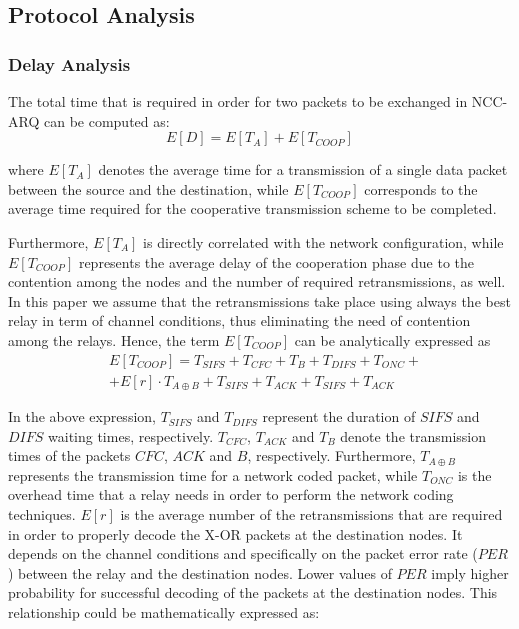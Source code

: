 \documentclass[conference]{IEEEtran}
\begin{document}
\subsection{Protocol Analysis}
\subsubsection{Delay Analysis}

The total time that is required in order for two packets to be exchanged in NCC-ARQ can be computed as:
\begin{equation}
\label{eq:delay}
 	E[D]= E[T_{A}]+E[T_{COOP}]
\end{equation}

where $E[T_{A}]$ denotes the average time for a transmission of a single data packet between the source and the destination, while $E[T_{COOP}]$ corresponds to the average time required for the cooperative transmission scheme to be completed.

Furthermore, $E[T_{A}]$ is directly correlated with the network configuration, while $E[T_{COOP}]$ represents the average delay of the cooperation phase due to the contention among the nodes and the number of required retransmissions, as well. In this paper we assume that the retransmissions take place using always the best relay in term of channel conditions, thus eliminating the need of contention among the relays. Hence, the term $E[T_{COOP}]$  can be analytically expressed as
\footnotesize
\begin{equation}
\label{eq:coop}
\begin{aligned}
 &E[T_{COOP}]=T_{SIFS}+T_{CFC}+T_{B}+T_{DIFS}+T_{ONC}+\\
 &+E[r]\cdot T_{A \oplus B}+T_{SIFS}+T_{ACK}+T_{SIFS}+T_{ACK}
 \end {aligned}
\end{equation}

\normalsize

In the above expression, $T_{SIFS}$ and $T_{DIFS}$ represent the duration of $SIFS$ and $DIFS$ waiting times, respectively. $T_{CFC}$, $T_{ACK}$ and $T_{B}$ denote the transmission times of the packets $CFC$, $ACK$ and $B$, respectively. Furthermore, $T_{A \oplus B}$ represents the transmission time for a network coded packet, while $T_{ONC}$ is the overhead time that a relay needs in order to perform the network coding techniques. $E[r]$ is the average number of the retransmissions that are required in order to properly decode the X-OR packets at the destination nodes. It depends on the channel conditions and specifically on the packet error rate ($PER$) between the relay and the destination nodes. Lower values of $PER$ imply higher probability for successful decoding of the packets at the destination nodes. This relationship could be mathematically expressed as:
\end{document}
